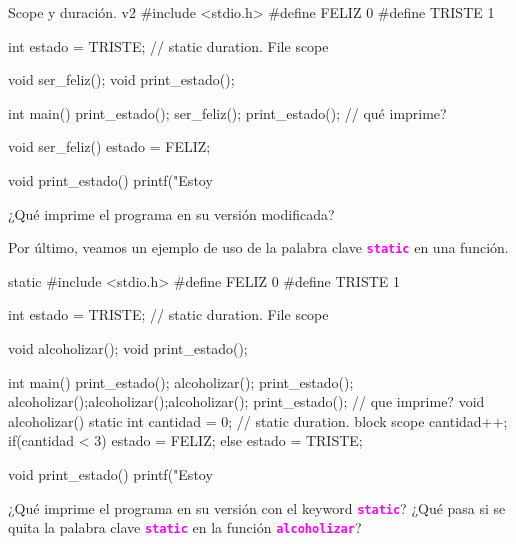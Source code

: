 \documentclass[]{scrartcl}
\newcommand{\hl}[1]{\textcolor{magenta}{\textbf{\texttt{#1}}}}
\begin{document}
\begin{cbox}[]{Scope y duración. v2}
  #include <stdio.h>
  #define FELIZ 0
  #define TRISTE 1
  
  int estado = TRISTE; // static duration. File scope
  
  void ser_feliz();
  void print_estado();
  
  int main(){
    print_estado();
    ser_feliz();
    print_estado(); // qué imprime?
  }
  
  void ser_feliz(){
    estado = FELIZ;
  }
  
  void print_estado(){
    printf("Estoy %
  }
\end{cbox}

\begin{exbox}
  ¿Qué imprime el programa en su versión modificada? 
\end{exbox}


Por último, veamos un ejemplo de uso de la palabra clave \hl{static} en una función.

\begin{cbox}[]{static}
  #include <stdio.h>
  #define FELIZ 0
  #define TRISTE 1

  int estado = TRISTE; // static duration. File scope
  
  void alcoholizar();
  void print_estado();
  
  int main(){
    print_estado();
    alcoholizar();
    print_estado();
    alcoholizar();alcoholizar();alcoholizar();
    print_estado(); // que imprime?
  }
  void alcoholizar(){
    static int cantidad = 0; // static duration. block scope
    cantidad++;
    if(cantidad < 3){
      estado = FELIZ;
    }else{
      estado = TRISTE;
    }
  }
  
  void print_estado(){
    printf("Estoy %
  }
\end{cbox}

\begin{exbox}
  ¿Qué imprime el programa en su versión con el keyword \hl{static}? ¿Qué pasa si se quita la palabra clave \hl{static} en la función \hl{alcoholizar}?
\end{exbox}
\end{document}
